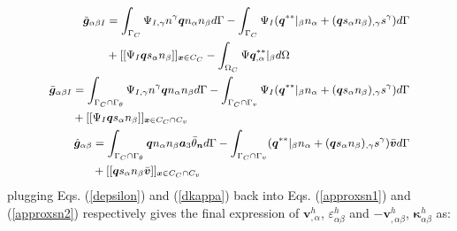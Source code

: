 \begin{subequations}
\begin{align}
\small
\begin{split}
\tilde{\boldsymbol g}_{\alpha\beta I} &= \int_{\Gamma_C} \Psi_{I,\gamma}n^\gamma \boldsymbol q n_\alpha n_\beta d\Gamma 
- \int_{\Gamma_C} \Psi_I(\boldsymbol q^{**}\vert_\beta n_\alpha + (\boldsymbol q s_\alpha n_\beta)_{,\gamma}s^\gamma) d\Gamma \\
&+ [[\Psi_I \boldsymbol q s_\alpha n_\beta]]_{\boldsymbol x\in C_C}
- \int_{\Omega_C} \Psi \boldsymbol q^{**}_{,\alpha}\vert_\beta d\Omega \\
\end{split} \\
\small
\begin{split}
\bar{\boldsymbol g}_{\alpha\beta I} &= \int_{\Gamma_C\cap\Gamma_\theta} \Psi_{I,\gamma}n^\gamma \boldsymbol q n_\alpha n_\beta d\Gamma 
- \int_{\Gamma_C\cap\Gamma_v} \Psi_I(\boldsymbol q^{**}\vert_\beta n_\alpha + (\boldsymbol q s_\alpha n_\beta)_{,\gamma}s^\gamma) d\Gamma \\
&+ [[\Psi_I \boldsymbol q s_\alpha n_\beta]]_{\boldsymbol x\in C_C\cap C_v}
\end{split} \\
\small
\begin{split}
\hat{\boldsymbol g}_{\alpha\beta} &= \int_{\Gamma_C\cap\Gamma_\theta} \boldsymbol q n_\alpha n_\beta \boldsymbol a_3 \bar{\theta}_{\boldsymbol n} d\Gamma 
- \int_{\Gamma_C\cap\Gamma_v}(\boldsymbol q^{**}\vert_\beta n_\alpha + (\boldsymbol q s_\alpha n_\beta)_{,\gamma}s^\gamma)\bar{\boldsymbol v} d\Gamma \\
&+ [[\boldsymbol q s_\alpha n_\beta \bar{\boldsymbol v}]]_{\boldsymbol x\in C_C\cap C_v}
\end{split}
\end{align}
\end{subequations}
plugging Eqs. (\ref{depsilon}) and (\ref{dkappa}) back into Eqs. (\ref{approxsn1}) and (\ref{approxsn2}) respectively gives the final expression of $\boldsymbol v^h_{,\alpha}$, $\varepsilon^h_{\alpha\beta}$ and $-\boldsymbol v^h_{,\alpha\beta}$, $\boldsymbol \kappa^h_{\alpha\beta}$ as:
